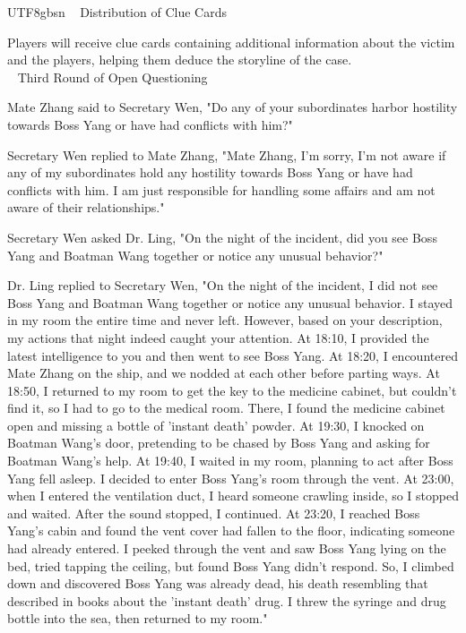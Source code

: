 \documentclass[11pt]{article}
\begin{document}
{\begin{CJK}{UTF8}{gbsn}
\ \raisedrule[.5ex]{1pt} Distribution of Clue Cards \raisedrule[.5ex]{1pt} \

Players will receive clue cards containing additional information about the victim and the players, helping them deduce the storyline of the case.\\

\ \raisedrule[.5ex]{1pt} Third Round of Open Questioning \raisedrule[.5ex]{1pt} \ 

Mate Zhang said to Secretary Wen, "Do any of your subordinates harbor hostility towards Boss Yang or have had conflicts with him?"

Secretary Wen replied to Mate Zhang, "Mate Zhang, I'm sorry, I'm not aware if any of my subordinates hold any hostility towards Boss Yang or have had conflicts with him. I am just responsible for handling some affairs and am not aware of their relationships."

Secretary Wen asked Dr. Ling, "On the night of the incident, did you see Boss Yang and Boatman Wang together or notice any unusual behavior?"

Dr. Ling replied to Secretary Wen, "On the night of the incident, I did not see Boss Yang and Boatman Wang together or notice any unusual behavior. I stayed in my room the entire time and never left. However, based on your description, my actions that night indeed caught your attention. At 18:10, I provided the latest intelligence to you and then went to see Boss Yang. At 18:20, I encountered Mate Zhang on the ship, and we nodded at each other before parting ways. At 18:50, I returned to my room to get the key to the medicine cabinet, but couldn’t find it, so I had to go to the medical room. There, I found the medicine cabinet open and missing a bottle of 'instant death' powder. At 19:30, I knocked on Boatman Wang's door, pretending to be chased by Boss Yang and asking for Boatman Wang's help. At 19:40, I waited in my room, planning to act after Boss Yang fell asleep. I decided to enter Boss Yang's room through the vent. At 23:00, when I entered the ventilation duct, I heard someone crawling inside, so I stopped and waited. After the sound stopped, I continued. At 23:20, I reached Boss Yang's cabin and found the vent cover had fallen to the floor, indicating someone had already entered. I peeked through the vent and saw Boss Yang lying on the bed, tried tapping the ceiling, but found Boss Yang didn’t respond. So, I climbed down and discovered Boss Yang was already dead, his death resembling that described in books about the 'instant death' drug. I threw the syringe and drug bottle into the sea, then returned to my room."


\end{CJK}}
\end{document}
